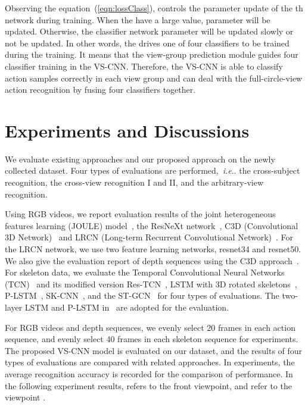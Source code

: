 \documentclass[journal]{IEEEtran}
\makeatletter
\DeclareRobustCommand\onedot{\futurelet\@let@token\@onedot}
\def\@onedot{\ifx\@let@token.\else.\null\fi\xspace}
\def\ie{\emph{i.e}\onedot} \def\Ie{\emph{I.e}\onedot}
\makeatother
\begin{document}
Observing the equation~(\ref{eqn:lossClass}),  controls the parameter update of the th network during training. When the  have a large value, parameter  will be updated. Otherwise, the classifier network parameter  will be updated slowly or not be updated. In other words, the  drives one of four classifiers to be trained during the training. It means that the view-group prediction module guides four classifier training in the VS-CNN. Therefore, the VS-CNN is able to classify action samples correctly in each view group and can deal with the full-circle-view action recognition by fusing four classifiers together.

\section{Experiments and Discussions}
\label{sec:experiment}

We evaluate existing approaches and our proposed approach on the newly collected dataset. Four types of evaluations are performed,~\ie the cross-subject recognition, the cross-view recognition I and II, and the arbitrary-view recognition.

Using RGB videos, we report evaluation results of the joint heterogeneous features learning (JOULE) model~\cite{JOULE2015,JOULE2016}, the ResNeXt network~\cite{ResNeXtARX2018}, C3D (Convolutional 3D Network)~\cite{C3DICCV2015} and LRCN (Long-term Recurrent Convolutional Network)~\cite{LRCNCVPR2015}. For the LRCN network, we use two feature learning networks, resnet34 and resnet50.
We also give the evaluation report of depth sequences using the C3D approach~\cite{C3DICCV2015}.
For skeleton data, we evaluate the Temporal Convolutional Neural Networks (TCN)~\cite{TCN2017} and its modified version Res-TCN~\cite{ResTCN2017}, LSTM with 3D rotated skeletons~\cite{ShahroudyNTU2016}, P-LSTM~\cite{ShahroudyNTU2016}, SK-CNN~\cite{EnhancedSK2017}, and the ST-GCN~\cite{STGCN2018} for four types of evaluations. The two-layer LSTM and P-LSTM in~\cite{ShahroudyNTU2016} are adopted for the evaluation.

For RGB videos and depth sequences, we evenly select 20 frames in each action sequence, and evenly select 40 frames in each skeleton sequence for experiments. The proposed VS-CNN model is evaluated on our dataset, and the results of four types of evaluations are compared with related approaches. In experiments, the average recognition accuracy is recorded for the comparison of performance. In the following experiment results,  refers to the front viewpoint, and  refer to the viewpoint .
\end{document}
